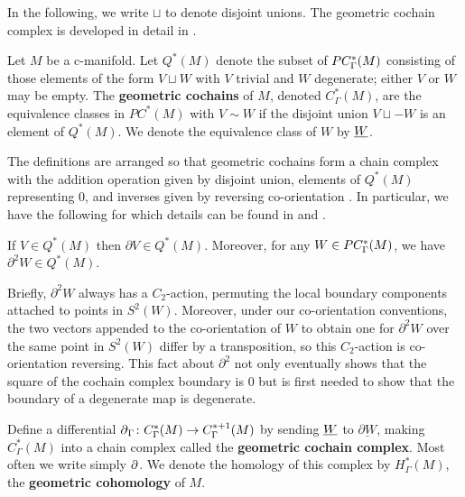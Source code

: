 In the following, we write $\sqcup$ to denote disjoint unions.
The geometric cochain complex is developed in detail in \cite[Section 4.2]{medina2022foundations}.

\begin{definition}\label{D:geometric cohomology}
	Let $M$ be a c-manifold.
	Let $Q^*(M)$ denote the subset of $PC_\Gamma^*(M)$ consisting of those elements of the form $V \sqcup W$ with $V$ trivial and $W$ degenerate; either $V$ or $W$ may be empty.
	The \textbf{geometric cochains} of $M$, denoted $C_\Gamma^*(M)$, are the equivalence classes in $PC^*(M)$ with $V \sim W$ if the disjoint union $V \sqcup -W$ is an element of $Q^*(M)$.
	We denote the equivalence class of $W$ by $\underline{W}$.
\end{definition}

The definitions are arranged so that geometric cochains form a chain complex with the addition operation given by disjoint union, elements of $Q^*(M)$ representing $0$, and inverses given by reversing co-orientation \cite[Lemma 4.19]{medina2022foundations}.
In particular, we have the following for which details can be found in \cite{Lipy14} and \cite[Lemma 3.26]{medina2022foundations}.

\begin{proposition}
	If $V \in Q^*(M)$ then $\partial V \in Q^*(M)$.
	Moreover, for any $W \in PC_\Gamma^*(M)$, we have $\partial^2 W \in Q^*(M)$.
\end{proposition}

Briefly, $\partial^2 W$ always has a $C_2$-action, permuting the local boundary components attached to points in $S^2(W)$.
Moreover, under our co-orientation conventions, the two vectors appended to the co-orientation of $W$ to obtain one for $\partial^2 W$ over the same point in $S^2(W)$ differ by a transposition, so this $C_2$-action is co-orientation reversing.
This fact about $\partial^2$ not only eventually shows that the square of the cochain complex boundary is $0$ but is first needed to show that the boundary of a degenerate map is degenerate.

\begin{definition}
	Define a differential $\operatorname{\partial}_\Gamma \colon C_\Gamma^*(M) \to C_\Gamma^{*+1}(M)$ by sending $\underline{W}$ to $ \underline{\partial W}$, making $C_\Gamma^*(M)$ into a chain complex called the {\bf geometric cochain complex}.
	Most often we write simply $\operatorname{\partial}$.
	We denote the homology of this complex by $H^*_\Gamma(M)$, the \textbf{geometric cohomology} of $M$.
\end{definition}

